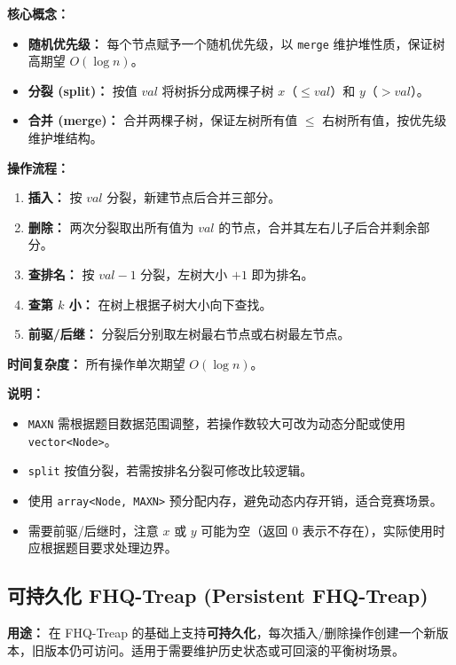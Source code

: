 \textbf{核心概念：}
\begin{itemize}
  \item \textbf{随机优先级：} 每个节点赋予一个随机优先级，以 \texttt{merge} 维护堆性质，保证树高期望 $O(\log n)$。
  \item \textbf{分裂 (split)：} 按值 $val$ 将树拆分成两棵子树 $x$（$\le val$）和 $y$（$> val$）。
  \item \textbf{合并 (merge)：} 合并两棵子树，保证左树所有值 $\le$ 右树所有值，按优先级维护堆结构。
\end{itemize}

\textbf{操作流程：}
\begin{enumerate}
  \item \textbf{插入：} 按 $val$ 分裂，新建节点后合并三部分。
  \item \textbf{删除：} 两次分裂取出所有值为 $val$ 的节点，合并其左右儿子后合并剩余部分。
  \item \textbf{查排名：} 按 $val-1$ 分裂，左树大小 $+1$ 即为排名。
  \item \textbf{查第 $k$ 小：} 在树上根据子树大小向下查找。
  \item \textbf{前驱/后继：} 分裂后分别取左树最右节点或右树最左节点。
\end{enumerate}

\textbf{时间复杂度：}
所有操作单次期望 $O(\log n)$。



\textbf{说明：}
\begin{itemize}
  \item \texttt{MAXN} 需根据题目数据范围调整，若操作数较大可改为动态分配或使用 \texttt{vector<Node>}。
  \item \texttt{split} 按值分裂，若需按排名分裂可修改比较逻辑。
  \item 使用 \texttt{array<Node, MAXN>} 预分配内存，避免动态内存开销，适合竞赛场景。
  \item 需要前驱/后继时，注意 $x$ 或 $y$ 可能为空（返回 $0$ 表示不存在），实际使用时应根据题目要求处理边界。
\end{itemize}

\subsection{可持久化 FHQ-Treap (Persistent FHQ-Treap)}

\textbf{用途：}
在 FHQ-Treap 的基础上支持\textbf{可持久化}，每次插入/删除操作创建一个新版本，旧版本仍可访问。适用于需要维护历史状态或可回滚的平衡树场景。

